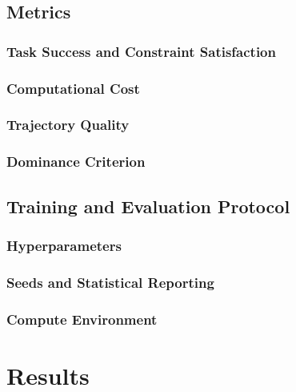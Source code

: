 \documentclass[headsepline,footsepline,footinclude=false,oneside,fontsize=11pt,paper=a4,listof=totoc,bibliography=totoc]{scrbook}
\begin{document}
\section{Metrics}\label{sec:setup:metrics}
\subsection{Task Success and Constraint Satisfaction}\label{sec:setup:metrics:sc}
\subsection{Computational Cost}\label{sec:setup:metrics:cost}
\subsection{Trajectory Quality}\label{sec:setup:metrics:quality}
\subsection{Dominance Criterion}\label{sec:setup:metrics:pareto}

\section{Training and Evaluation Protocol}\label{sec:setup:protocol}
\subsection{Hyperparameters}\label{sec:setup:protocol:hparams}
\subsection{Seeds and Statistical Reporting}\label{sec:setup:protocol:seeds}
\subsection{Compute Environment}\label{sec:setup:protocol:compute}

\chapter{Results}\label{ch:results}
\end{document}
